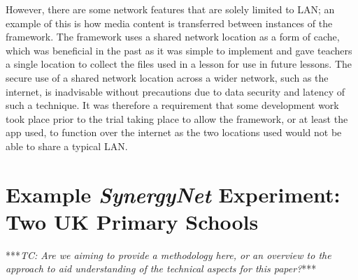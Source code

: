 \documentclass[a4paper,11pt]{article}
\begin{document}
However, there are some network features that are solely limited to LAN; an example of this is how media content is transferred between instances of the framework.
The framework uses a shared network location as a form of cache, which was beneficial in the past as it was simple to implement and gave teachers a single location to collect the files used in a lesson for use in future lessons.
The secure use of a shared network location across a wider network, such as the internet, is inadvisable without precautions due to data security and latency of such a technique.
It was therefore a requirement that some development work took place prior to the trial taking place to allow the framework, or at least the app used, to function over the internet as the two locations used would not be able to share a typical LAN.

\section{Example {\emph{SynergyNet}} Experiment: Two UK Primary Schools}

***{\emph{TC: Are we aiming to provide a methodology here, or an overview to the approach to aid understanding of the technical aspects for this paper?}}***
\end{document}
